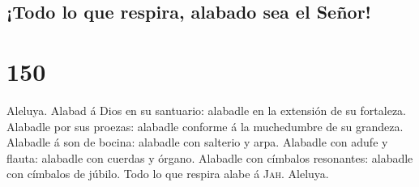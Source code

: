 \hypertarget{todo-lo-que-respira-alabado-sea-el-seuxf1or}{%
\subsection{¡Todo lo que respira, alabado sea el
Señor!}\label{todo-lo-que-respira-alabado-sea-el-seuxf1or}}

\hypertarget{section-149}{%
\section{150}\label{section-149}}

 Aleluya. Alabad á Dios en su santuario: alabadle en la
extensión de su fortaleza.  Alabadle por sus proezas:
alabadle conforme á la muchedumbre de su grandeza. 
Alabadle á son de bocina: alabadle con salterio y arpa. 
Alabadle con adufe y flauta: alabadle con cuerdas y órgano.
 Alabadle con címbalos resonantes: alabadle con címbalos
de júbilo.  Todo lo que respira alabe á \textsc{Jah}.
Aleluya.
